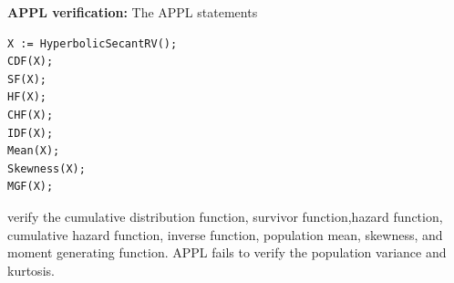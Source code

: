 \documentclass[12pt,fullpage]{article}
\begin{document}
\noindent
{\bf APPL verification:}
The APPL statements
\begin{verbatim}
X := HyperbolicSecantRV();
CDF(X);
SF(X);
HF(X);
CHF(X);
IDF(X);
Mean(X);
Skewness(X);
MGF(X);
\end{verbatim}
verify the cumulative distribution function, survivor function,hazard function, cumulative hazard function, inverse function, population mean, skewness, and moment generating function. APPL fails to verify the population variance and kurtosis.
\end{document}
